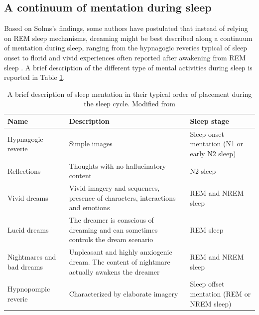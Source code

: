 \subsection{A continuum of mentation during sleep}
\label{sec:dream-research:link:continuum}

Based on Solms’s findings, some authors have postulated that instead of relying on REM sleep mechanisms, dreaming might be best described along a continuum of mentation during sleep, ranging from the hypnagogic reveries typical of sleep onset to florid and vivid experiences often reported after awakening from REM sleep \citep{schwartz_dreaming:_2005}. A brief description of the different type of mental activities during sleep is reported in Table \ref{tab:intro:continuum}.

\begin{table}[htb]
	\caption[A continuum of sleep mentation]{A brief description of sleep mentation in their typical order of placement during the sleep cycle. Modified from \citet{de_koninck_sleep_2012}}
	\label{tab:intro:continuum}
	\begin{tabularx}{\textwidth}{XXX}
	\toprule
	Name                  		   & Description                                                                          		   & Sleep stage                         			\\ \midrule
	Hypnagogic reverie             & Simple images                                                                                 & Sleep onset mentation (N1 or early N2 sleep) 	\\
	Reflections                    & Thoughts with no hallucinatory content                                                        & N2 sleep                                     	\\
	Vivid dreams                   & Vivid imagery and sequences, presence of characters, interactions and emotions                & REM and NREM sleep                           	\\
	Lucid dreams                   & The dreamer is conscious of dreaming and can sometimes controls the dream scenario            & REM sleep                                    	\\
	Nightmares and bad dreams 	   & Unpleasant and highly anxiogenic dream. The content of nightmare actually awakens the dreamer & REM and NREM sleep                             \\
	Hypnopompic reverie            & Characterized by elaborate imagery                                                            & Sleep offset mentation (REM or NREM sleep)   	\\ \bottomrule
	\end{tabularx}
\end{table}


